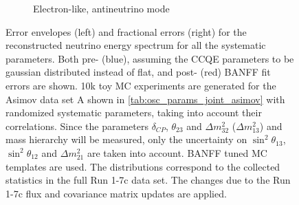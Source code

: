 \begin{figure}[htb]
\begin{subfigure}[b]{0.49\textwidth}
\caption{Electron-like, antineutrino mode}
\end{subfigure}
\caption {
Error envelopes (left) and fractional errors (right) for the reconstructed neutrino energy spectrum
for all the systematic parameters.
Both pre- (blue), assuming the CCQE parameters to be gaussian distributed instead of flat, 
and post- (red) BANFF fit errors are shown.
10k toy MC experiments are generated for the Asimov data set A shown in \cref{tab:osc_params_joint_asimov}
with randomized systematic parameters, taking into account their correlations.
Since the parameters $\delta_{CP}$, $\theta_{23}$ and $\Delta m^2_{32}$ ($\Delta m^2_{13}$) and mass hierarchy
will be measured,
only the uncertainty on 
$\sin^2 \theta_{13}$,
$\sin^2 \theta_{12}$
and 
$\Delta m^2_{21}$ 
are taken into account.
BANFF tuned MC templates are used. 
The distributions correspond to the collected statistics in the full Run 1-7c data set.
The changes due to the Run 1-7c flux and covariance matrix updates are applied.
}
\label{fig:spectra_systematic_Asimov_A_prebanff_run17c}
\end{figure}




